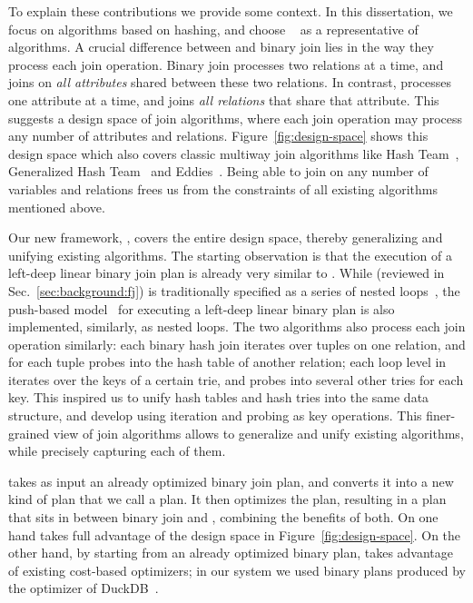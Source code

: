 To explain these contributions we provide some context.
%
In this dissertation, we focus on algorithms based on hashing,
  and choose \GJ~\cite{DBLP:journals/sigmod/NgoRR13} as a representative of \WCOJ algorithms.
A crucial difference between \GJ and binary join lies 
  in the way they process each join operation. 
Binary join processes two relations at a time, 
  and joins on \emph{all attributes} 
  shared between these two relations. 
In contrast, \GJ processes one attribute at a time, 
  and joins \emph{all relations} that share that attribute.
This suggests a design space of join algorithms, 
  where each join operation may process any 
  number of attributes and relations.
Figure~\ref{fig:design-space} shows this design space
  which also covers classic multiway join algorithms 
  like Hash Team~\cite{DBLP:conf/vldb/GraefeBC98}, 
  Generalized Hash Team~\cite{DBLP:conf/vldb/KemperKW99}
  and Eddies~\cite{DBLP:conf/sigmod/HellersteinA00}.
Being able to join on any number of variables and relations
  frees us from the constraints of all existing algorithms 
  mentioned above. 

Our new framework, \FJ,
  covers the entire design space, 
  thereby generalizing and unifying existing algorithms.
The starting observation is that the execution of a left-deep linear 
  binary join plan is already very similar to \GJ.
While \GJ (reviewed in Sec.~\ref{sec:background:fj}) is traditionally specified as a series of nested loops~\cite{DBLP:journals/sigmod/NgoRR13},
  the push-based model~\cite{DBLP:journals/pvldb/Neumann11,DBLP:journals/pvldb/KerstenLKNPB18} for executing a left-deep linear binary plan
  is also implemented, similarly, as nested loops.
The two algorithms also process each join operation similarly:
  each binary hash join iterates over tuples on one relation, 
  and for each tuple probes into the hash table of another relation;
  each loop level in \GJ iterates over the keys of a certain trie,
  and probes into several other tries for each key.
This inspired us to unify hash tables and hash tries into the same data structure, 
  and develop \FJ using iteration and probing as key operations.
This finer-grained view of join algorithms allows \FJ
  to generalize and unify existing algorithms,
  while precisely capturing each of them.

  \FJ takes as input an already optimized binary join plan, and
  converts it into a new kind of plan that we call a \FJ plan.  It
  then optimizes the \FJ plan, resulting in a plan that sits in
  between binary join and \GJ, combining the benefits of both.  On one
  hand \FJ takes full advantage of the design space in
  Figure~\ref{fig:design-space}.  On the other hand, by starting from
  an already optimized binary plan, \FJ takes advantage of existing
  cost-based optimizers; in our system we used binary plans produced by
  the optimizer of DuckDB~\cite{DBLP:conf/cidr/RaasveldtM20,DBLP:conf/vldb/Raasveldt22}.

